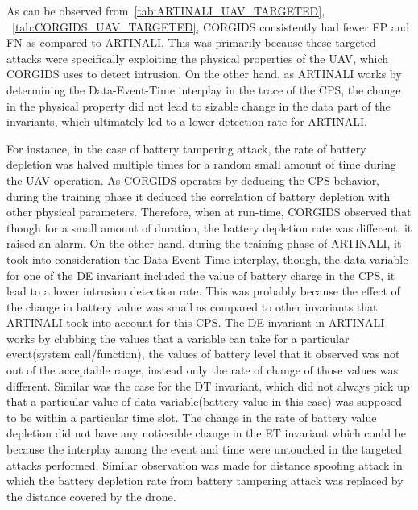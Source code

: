 \begin{table}
\centering
  \caption{Results of intrusion detection by \ac{CORGIDS} for Targeted attacks on \ac{UAV} platform}
  \label{tab:CORGIDS_UAV_TARGETED}
\end{table}

As can be observed from~\autoref{tab:ARTINALI_UAV_TARGETED}, ~\autoref{tab:CORGIDS_UAV_TARGETED}, \ac{CORGIDS} consistently had fewer \ac{FP} and \ac{FN} as compared to ARTINALI. This was primarily because these targeted attacks were specifically exploiting the physical properties of the \ac{UAV}, which \ac{CORGIDS} uses to detect intrusion. On the other hand, as ARTINALI works by determining the Data-Event-Time interplay in the trace of the \ac{CPS}, the change in the physical property did not lead to sizable change in the data part of the invariants, which ultimately led to a lower detection rate for ARTINALI.

For instance, in the case of battery tampering attack, the rate of battery depletion was halved multiple times for a random small amount of time during the \ac{UAV} operation. As \ac{CORGIDS} operates by deducing the \ac{CPS} behavior, during the training phase it deduced the correlation of battery depletion with other physical parameters. Therefore, when at run-time, \ac{CORGIDS}  observed that though for a small amount of duration, the battery depletion rate was different, it raised an alarm. On the other hand, during the training phase of ARTINALI, it took into consideration the Data-Event-Time interplay, though, the data variable for one of the D\textbar E invariant included the value of battery charge in the \ac{CPS}, it lead to a lower intrusion detection rate. This was probably because the effect of the change in battery value was small as compared to other invariants that ARTINALI took into account for this \ac{CPS}. The D\textbar E invariant in ARTINALI works by clubbing the values that a variable can take for a particular event(system call/function), the values of battery level that it observed was not out of the acceptable range, instead only the rate of change of those values was different. Similar was the case for the D\textbar T invariant, which did not always pick up that a particular value of data variable(battery value in this case) was supposed to be within a particular time slot. The change in the rate of battery value depletion did not have any noticeable change in the E\textbar T invariant which could be because the interplay among the event and time were untouched in the targeted attacks performed. Similar observation was made for distance spoofing attack in which the battery depletion rate from battery tampering attack was replaced by the distance covered by the drone.

